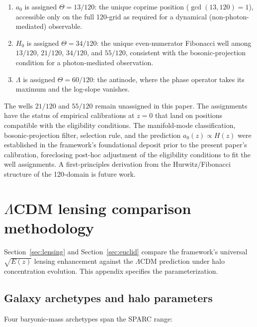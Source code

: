 \documentclass[11pt,a4paper]{article}
\numberwithin{equation}{section}
\numberwithin{table}{section}
\numberwithin{figure}{section}
\newcommand{\afid}{a_0}
\newcommand{\Ez}{E(z)}
\begin{document}
\begin{enumerate}[label=(\alph*), leftmargin=*]
\item $\afid$ is assigned $\Theta = 13/120$: the unique coprime
position ($\gcd(13, 120) = 1$), accessible only on the full 120-grid as
required for a dynamical (non-photon-mediated) observable.

\item $H_0$ is assigned $\Theta = 34/120$: the unique even-numerator
Fibonacci well among $13/120$, $21/120$, $34/120$, and $55/120$,
consistent with the bosonic-projection condition for a photon-mediated
observation.

\item $\Lambda$ is assigned $\Theta = 60/120$: the antinode, where the
phase operator takes its maximum and the log-slope vanishes.
\end{enumerate}

The wells $21/120$ and $55/120$ remain unassigned in this paper. The
assignments have the status of empirical calibrations at $z = 0$ that
land on positions compatible with the eligibility conditions. The
manifold-mode classification, bosonic-projection filter, selection
rule, and the prediction $\afid(z) \propto H(z)$ were established in
the framework's foundational deposit \citep{Shatto2025} prior to the
present paper's calibration, foreclosing post-hoc adjustment of the
eligibility conditions to fit the well assignments. A first-principles
derivation from the Hurwitz/Fibonacci structure of the 120-domain is
future work.

\section{$\Lambda$CDM lensing comparison methodology}
\label{app:lensing}

Section~\ref{sec:lensing} and Section~\ref{sec:euclid} compare the
framework's universal $\sqrt{\Ez}$ lensing enhancement against the
$\Lambda$CDM prediction under halo concentration evolution. This
appendix specifies the parameterization.

\subsection{Galaxy archetypes and halo parameters}
\label{app:archetypes}

Four baryonic-mass archetypes span the SPARC range:
\end{document}
